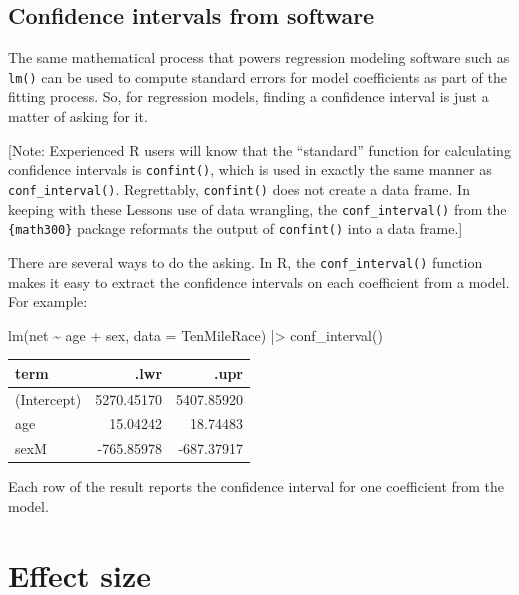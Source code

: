 \documentclass[
  letterpaper,
  DIV=11,
  numbers=noendperiod,
  oneside]{scrreprt}
\newenvironment{Shaded}{\begin{snugshade}}{\end{snugshade}}
\newcommand{\AttributeTok}[1]{\textcolor[rgb]{0.40,0.45,0.13}{#1}}
\newcommand{\FunctionTok}[1]{\textcolor[rgb]{0.28,0.35,0.67}{#1}}
\newcommand{\NormalTok}[1]{\textcolor[rgb]{0.00,0.23,0.31}{#1}}
\newcommand{\SpecialCharTok}[1]{\textcolor[rgb]{0.37,0.37,0.37}{#1}}
\begin{document}
\hypertarget{confidence-intervals-from-software}{%
\section{Confidence intervals from
software}\label{confidence-intervals-from-software}}

The same mathematical process that powers regression modeling software
such as \texttt{lm()} can be used to compute standard errors for model
coefficients as part of the fitting process. So, for regression models,
finding a confidence interval is just a matter of asking for it.

{[}Note: Experienced R users will know that the ``standard'' function
for calculating confidence intervals is \texttt{confint()}, which is
used in exactly the same manner as \texttt{conf\_interval()}.
Regrettably, \texttt{confint()} does not create a data frame. In keeping
with these Lessons use of data wrangling, the \texttt{conf\_interval()}
from the \texttt{\{math300\}} package reformats the output of
\texttt{confint()} into a data frame.{]}

There are several ways to do the asking. In R, the
\texttt{conf\_interval()} function makes it easy to extract the
confidence intervals on each coefficient from a model. For example:

\begin{Shaded}
\begin{Highlighting}[]
\FunctionTok{lm}\NormalTok{(net }\SpecialCharTok{\textasciitilde{}}\NormalTok{ age }\SpecialCharTok{+}\NormalTok{ sex, }\AttributeTok{data =}\NormalTok{ TenMileRace) }\SpecialCharTok{|\textgreater{}} \FunctionTok{conf\_interval}\NormalTok{() }
\end{Highlighting}
\end{Shaded}

\ttfamily 
\begin{tabular}{lrr}
\toprule
term & .lwr & .upr\\
\midrule
(Intercept) & 5270.45170 & 5407.85920\\
age & 15.04242 & 18.74483\\
sexM & -765.85978 & -687.37917\\
\bottomrule
\end{tabular} \normalfont
\bigskip

Each row of the result reports the confidence interval for one
coefficient from the model.

\hypertarget{sec-lesson-24}{%
\chapter{Effect size}\label{sec-lesson-24}}
\end{document}
